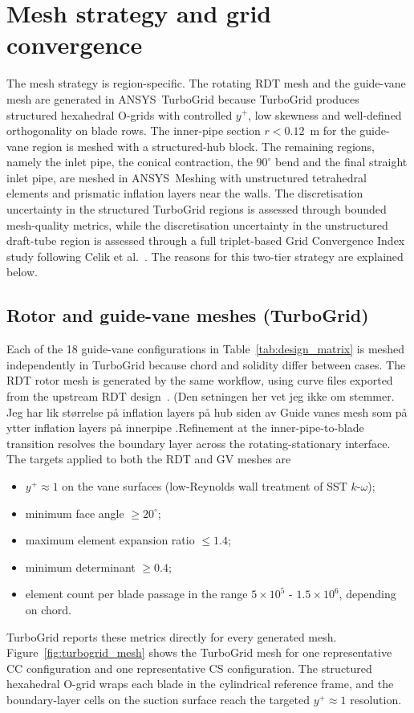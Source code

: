\section{Mesh strategy and grid convergence}
\label{sec:methods_mesh}

The mesh strategy is region-specific. The rotating RDT mesh and the guide-vane mesh are generated in ANSYS~TurboGrid because TurboGrid produces structured hexahedral O-grids with controlled $y^+$, low skewness and well-defined orthogonality on blade rows. The inner-pipe section $r < 0.12$~m for the guide-vane region is meshed with a structured-hub block. The remaining regions, namely the inlet pipe, the conical contraction, the $90^\circ$ bend and the final straight inlet pipe, are meshed in ANSYS~Meshing with unstructured tetrahedral elements and prismatic inflation layers near the walls. The discretisation uncertainty in the structured TurboGrid regions is assessed through bounded mesh-quality metrics, while the discretisation uncertainty in the unstructured draft-tube region is assessed through a full triplet-based Grid Convergence Index study following Celik et al.~\cite{Celik2008}. The reasons for this two-tier strategy are explained below.

\subsection{Rotor and guide-vane meshes (TurboGrid)}
\label{sec:turbogrid_quality}

Each of the 18 guide-vane configurations in Table~\ref{tab:design_matrix} is meshed independently in TurboGrid because chord and solidity differ between cases. The RDT rotor mesh is generated by the same workflow, using curve files exported from the upstream RDT design~\cite{DjupeslandTrivedi2025}. (Den setningen her vet jeg ikke om stemmer. Jeg har lik størrelse på inflation layers på hub siden av Guide vanes mesh som på ytter inflation layers på innerpipe .Refinement at the inner-pipe-to-blade transition resolves the boundary layer across the rotating-stationary interface. The targets applied to both the RDT and GV meshes are
\begin{itemize}
  \item $y^+ \approx 1$ on the vane surfaces (low-Reynolds wall treatment of SST $k$-$\omega$);
  \item minimum face angle $\geq 20^\circ$;
  \item maximum element expansion ratio $\leq 1.4$;
  \item minimum determinant $\geq 0.4$;
  \item element count per blade passage in the range $5\times 10^5$ - $1.5\times 10^6$, depending on chord.
\end{itemize}
TurboGrid reports these metrics directly for every generated mesh. Figure~\ref{fig:turbogrid_mesh} shows the TurboGrid mesh for one representative CC configuration and one representative CS configuration. The structured hexahedral O-grid wraps each blade in the cylindrical reference frame, and the boundary-layer cells on the suction surface reach the targeted $y^+ \approx 1$ resolution.

